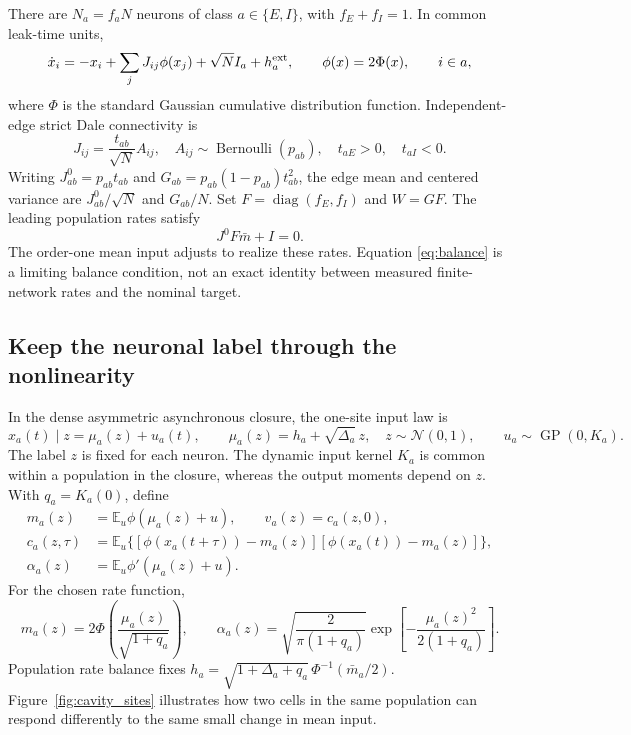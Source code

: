 \documentclass[11pt]{article}
\newcommand{\E}{\mathbb E}
\newcommand{\diag}{\operatorname{diag}}
\begin{document}
There are $N_a=f_aN$ neurons of class $a\in\{E,I\}$, with
$f_E+f_I=1$. In common leak-time units,
\begin{equation}
 \dot x_i=-x_i+\sum_jJ_{ij}\phi(x_j)+\sqrt N I_a+h_a^{\rm ext},
 \qquad \phi(x)=2\Phi(x),\qquad i\in a,
 \label{eq:model}
\end{equation}
where $\Phi$ is the standard Gaussian cumulative distribution function.
Independent-edge strict Dale connectivity is
\begin{equation}
 J_{ij}=\frac{t_{ab}}{\sqrt N}A_{ij},\quad
 A_{ij}\sim\operatorname{Bernoulli}(p_{ab}),\quad
 t_{aE}>0,\quad t_{aI}<0.
 \label{eq:connectivity}
\end{equation}
Writing $J^0_{ab}=p_{ab}t_{ab}$ and
$G_{ab}=p_{ab}(1-p_{ab})t_{ab}^2$, the edge mean and centered variance are
$J^0_{ab}/\sqrt N$ and $G_{ab}/N$. Set $F=\diag(f_E,f_I)$ and $W=GF$.
The leading population rates satisfy
\begin{equation}
 J^0F\bar m+I=0.
 \label{eq:balance}
\end{equation}
The order-one mean input adjusts to realize these rates. Equation
\eqref{eq:balance} is a limiting balance condition, not an exact identity
between measured finite-network rates and the nominal target.

\subsection{Keep the neuronal label through the nonlinearity}

In the dense asymmetric asynchronous closure, the one-site input law is
\begin{equation}
 x_a(t)\mid z=\mu_a(z)+u_a(t),\qquad
 \mu_a(z)=h_a+\sqrt{\Delta_a}\,z,\quad z\sim\mathcal N(0,1),
 \qquad u_a\sim\operatorname{GP}(0,K_a).
 \label{eq:conditional}
\end{equation}
The label $z$ is fixed for each neuron. The dynamic input kernel $K_a$ is
common within a population in the closure, whereas the output moments depend
on $z$. With $q_a=K_a(0)$, define
\begin{align}
 m_a(z)&=\E_u\phi(\mu_a(z)+u),\qquad
 v_a(z)=c_a(z,0),\nonumber\\
 c_a(z,\tau)&=\E_u\{[\phi(x_a(t+\tau))-m_a(z)]
                              [\phi(x_a(t))-m_a(z)]\},\label{eq:localmoments}\\
 \alpha_a(z)&=\E_u\phi'(\mu_a(z)+u).
 \nonumber
\end{align}
For the chosen rate function,
\begin{equation}
 m_a(z)=2\Phi\!\left(\frac{\mu_a(z)}{\sqrt{1+q_a}}\right),\qquad
 \alpha_a(z)=\sqrt{\frac{2}{\pi(1+q_a)}}
             \exp\!\left[-\frac{\mu_a(z)^2}{2(1+q_a)}\right].
 \label{eq:localerf}
\end{equation}
Population rate balance fixes
$h_a=\sqrt{1+\Delta_a+q_a}\,\Phi^{-1}(\bar m_a/2)$.
Figure~\ref{fig:cavity_sites} illustrates how two cells in the same
population can respond differently to the same small change in mean input.
\end{document}
